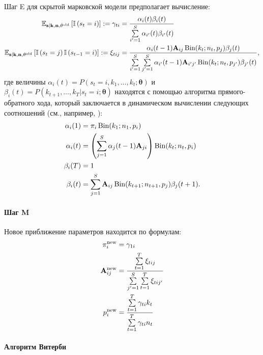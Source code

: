 Шаг E для скрытой марковской модели предполагает вычисление:
\begin{align*}
  \mathbb{E}_{\mathbf{s}|\mathbf{k}, \mathbf{n}, \mathbf{\theta^{\operatorname{old}}}} \left[ \mathbb{I}\left( s_t = i \right) \right]
  := \gamma_{ti}
  &= \frac{\alpha_i(t) \beta_i(t)}{\sum\limits_{i' = 1}^S \alpha_{i'}(t) \beta_{i'}(t)} \\
  \mathbb{E}_{\mathbf{s}|\mathbf{k}, \mathbf{n}, \mathbf{\theta^{\operatorname{old}}}} \left[ \mathbb{I}\left( s_t = j \right) \mathbb{I}\left( s_{t - 1} = i \right) \right]
  := \xi_{tij}
  &= \frac{\alpha_i(t - 1) \mathbf{A}_{ij} \operatorname{Bin}(k_t; n_t, p_j) \beta_j(t)}
          {\sum\limits_{i' = 1}^S \sum\limits_{j' = 1}^S
           \alpha_{i'}(t - 1) \mathbf{A}_{i'j'} \operatorname{Bin}(k_t; n_t, p_{j'}) \beta_{j'}(t)},
\end{align*}
где величины $\alpha_i(t) = P(s_t = i, k_1, \ldots, k_t; \mathbf{\theta})$ и
$\beta_i(t) = P(k_{t + 1}, \ldots, k_T| s_t = i; \mathbf{\theta})$
находятся с помощью алгоритма прямого-обратного хода, который заключается в
динамическом вычислении следующих соотношений (см., например, \cite{Rabiner1989}):
\begin{align*}
  \alpha_i(1)
  &= \pi_i \operatorname{Bin}(k_1; n_1, p_i) \\
  \alpha_i(t)
  &= \left( \sum\limits_{j = 1}^S \alpha_j(t - 1) \mathbf{A}_{ji}
     \right) \operatorname{Bin}(k_t; n_t, p_i) \\
  \beta_i(T)
  &= 1 \\
  \beta_i(t)
  &= \sum\limits_{j = 1}^S \mathbf{A}_{ij} \operatorname{Bin}(k_{t + 1}; n_{t + 1}, p_j) \beta_j(t + 1).
\end{align*}

\paragraph{Шаг M}

Новое приближение параметров находится по формулам:
\begin{align*}
  \pi_i^{\operatorname{new}} &= \gamma_{1i} \\
  \mathbf{A}_{ij}^{\operatorname{new}}
  &= \frac{\sum\limits_{t = 1}^T \xi_{tij}}
          {\sum\limits_{j' = 1}^S\sum\limits_{t = 1}^T \xi_{tij'}} \\
  p_i^{\operatorname{new}}
  &= \frac{\sum\limits_{t = 1}^T \gamma_{ti} k_t}{\sum\limits_{t = 1}^T \gamma_{ti} n_t}
\end{align*}


\paragraph{Алгоритм Витерби}


